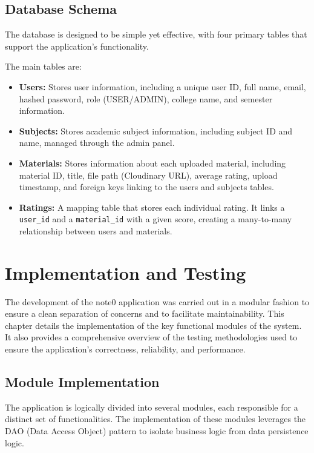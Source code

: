 \documentclass[12pt, a4paper]{report}
\begin{document}
\section{Database Schema}
The database is designed to be simple yet effective, with four primary tables that support the application's functionality.

The main tables are:
\begin{itemize}
    \item \textbf{Users:} Stores user information, including a unique user ID, full name, email, hashed password, role (USER/ADMIN), college name, and semester information.
    \item \textbf{Subjects:} Stores academic subject information, including subject ID and name, managed through the admin panel.
    \item \textbf{Materials:} Stores information about each uploaded material, including material ID, title, file path (Cloudinary URL), average rating, upload timestamp, and foreign keys linking to the users and subjects tables.
    \item \textbf{Ratings:} A mapping table that stores each individual rating. It links a \texttt{user\_id} and a \texttt{material\_id} with a given score, creating a many-to-many relationship between users and materials.
\end{itemize}



\chapter{Implementation and Testing}
The development of the note0 application was carried out in a modular fashion to ensure a clean separation of concerns and to facilitate maintainability. This chapter details the implementation of the key functional modules of the system. It also provides a comprehensive overview of the testing methodologies used to ensure the application's correctness, reliability, and performance.

\section{Module Implementation}
The application is logically divided into several modules, each responsible for a distinct set of functionalities. The implementation of these modules leverages the DAO (Data Access Object) pattern to isolate business logic from data persistence logic.
\end{document}
